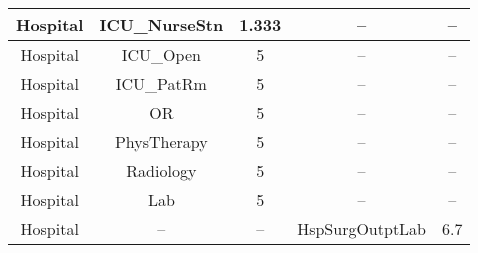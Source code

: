 \begin{table}
\begin{tabular}{|c|c|c|c|c|}
Hospital               & ICU\_NurseStn           & 1.333                                                                                                         & --                                & --                                                                                                             \\ \hline
Hospital               & ICU\_Open               & 5                                                                                                             & --                                & --                                                                                                             \\ \hline
Hospital               & ICU\_PatRm              & 5                                                                                                             & --                                & --                                                                                                             \\ \hline
Hospital               & OR                      & 5                                                                                                             & --                                & --                                                                                                             \\ \hline
Hospital               & PhysTherapy             & 5                                                                                                             & --                                & --                                                                                                             \\ \hline
Hospital               & Radiology               & 5                                                                                                             & --                                & --                                                                                                             \\ \hline
Hospital               & Lab                     & 5                                                                                                             & --                                & --                                                                                                             \\ \hline
Hospital               & --                      & --                                                                                                            & HspSurgOutptLab                   & 6.7                                                                                                            \\ \hline

\end{tabular}
\end{table}

